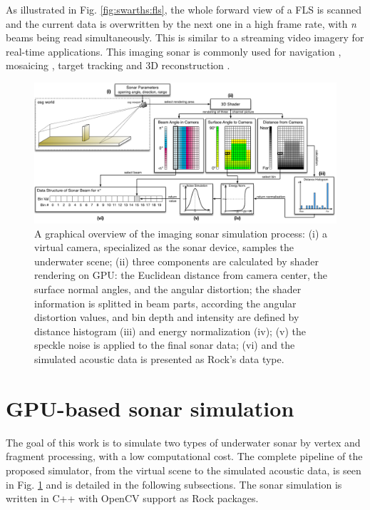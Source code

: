 \documentclass[final,5p,times]{elsarticle}
\begin{document}
As illustrated in Fig. \ref{fig:swarths:fls}, the whole forward view of a
FLS is scanned and the current data is overwritten by the next one in a high
frame rate, with \textit{n} beams being read simultaneously. This is similar
to a streaming video imagery for real-time applications. This imaging sonar
is commonly used for navigation \cite{fallon2013},
mosaicing \cite{hurtos2014}, target tracking \cite{liu2016}
and 3D reconstruction \cite{huang2015}.


\begin{figure}[t]
    \includegraphics[width=0.85\paperwidth]{figs/sonar_sim}
    \centering
    \captionsetup{justification=centering}
    \caption{A graphical overview of the imaging sonar simulation process:
    (i) a virtual camera, specialized as the sonar device, samples the
    underwater scene; (ii) three components are calculated by shader
    rendering on GPU: the Euclidean distance from camera center, the surface
    normal angles, and the angular distortion; the shader information is
    splitted in beam parts, according the angular distortion values, and
    bin depth and intensity are defined by distance histogram (iii) and energy
    normalization (iv); (v) the speckle noise is applied to the final sonar data;
    (vi) and the simulated acoustic data is presented as Rock's data type.}
    \label{fig:sonar_sim}
\end{figure}



\section{GPU-based sonar simulation}
\label{dev}

The goal of this work is to simulate two types of underwater sonar by vertex
and fragment processing, with a low computational cost. The complete pipeline
of the proposed simulator, from the virtual scene to the simulated acoustic data,
is seen in Fig. \ref{fig:sonar_sim} and is detailed in the following subsections.
The sonar simulation is written in C++ with OpenCV \cite{bradski2000} support as
Rock packages.
\end{document}

